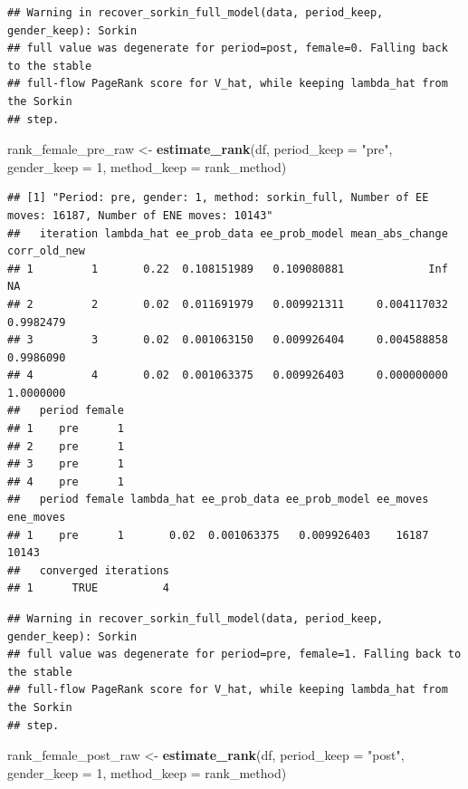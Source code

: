 \documentclass[
]{article}
\newenvironment{Shaded}{\begin{snugshade}}{\end{snugshade}}
\newcommand{\AttributeTok}[1]{\textcolor[rgb]{0.13,0.29,0.53}{#1}}
\newcommand{\DecValTok}[1]{\textcolor[rgb]{0.00,0.00,0.81}{#1}}
\newcommand{\FunctionTok}[1]{\textcolor[rgb]{0.13,0.29,0.53}{\textbf{#1}}}
\newcommand{\NormalTok}[1]{#1}
\newcommand{\OtherTok}[1]{\textcolor[rgb]{0.56,0.35,0.01}{#1}}
\newcommand{\StringTok}[1]{\textcolor[rgb]{0.31,0.60,0.02}{#1}}
\begin{document}
\begin{verbatim}
## Warning in recover_sorkin_full_model(data, period_keep, gender_keep): Sorkin
## full value was degenerate for period=post, female=0. Falling back to the stable
## full-flow PageRank score for V_hat, while keeping lambda_hat from the Sorkin
## step.
\end{verbatim}

\begin{Shaded}
\begin{Highlighting}[]
\NormalTok{rank\_female\_pre\_raw }\OtherTok{\textless{}{-}} \FunctionTok{estimate\_rank}\NormalTok{(df, }\AttributeTok{period\_keep =} \StringTok{"pre"}\NormalTok{, }\AttributeTok{gender\_keep =} \DecValTok{1}\NormalTok{, }\AttributeTok{method\_keep =}\NormalTok{ rank\_method)}
\end{Highlighting}
\end{Shaded}

\begin{verbatim}
## [1] "Period: pre, gender: 1, method: sorkin_full, Number of EE moves: 16187, Number of ENE moves: 10143"
##   iteration lambda_hat ee_prob_data ee_prob_model mean_abs_change corr_old_new
## 1         1       0.22  0.108151989   0.109080881             Inf           NA
## 2         2       0.02  0.011691979   0.009921311     0.004117032    0.9982479
## 3         3       0.02  0.001063150   0.009926404     0.004588858    0.9986090
## 4         4       0.02  0.001063375   0.009926403     0.000000000    1.0000000
##   period female
## 1    pre      1
## 2    pre      1
## 3    pre      1
## 4    pre      1
##   period female lambda_hat ee_prob_data ee_prob_model ee_moves ene_moves
## 1    pre      1       0.02  0.001063375   0.009926403    16187     10143
##   converged iterations
## 1      TRUE          4
\end{verbatim}

\begin{verbatim}
## Warning in recover_sorkin_full_model(data, period_keep, gender_keep): Sorkin
## full value was degenerate for period=pre, female=1. Falling back to the stable
## full-flow PageRank score for V_hat, while keeping lambda_hat from the Sorkin
## step.
\end{verbatim}

\begin{Shaded}
\begin{Highlighting}[]
\NormalTok{rank\_female\_post\_raw }\OtherTok{\textless{}{-}} \FunctionTok{estimate\_rank}\NormalTok{(df, }\AttributeTok{period\_keep =} \StringTok{"post"}\NormalTok{, }\AttributeTok{gender\_keep =} \DecValTok{1}\NormalTok{, }\AttributeTok{method\_keep =}\NormalTok{ rank\_method)}
\end{Highlighting}
\end{Shaded}
\end{document}
